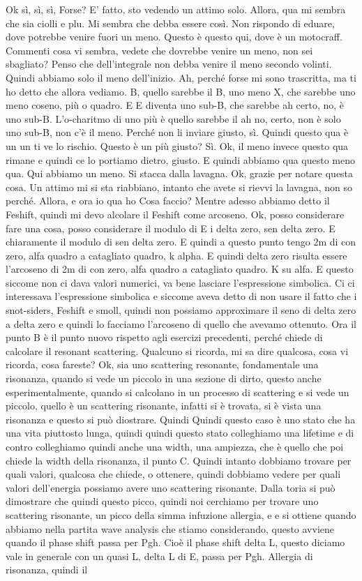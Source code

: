 {\begin{soluzione}
   Ok sì, sì, sì, Forse? E' fatto, sto vedendo un attimo solo. Allora, qua mi sembra che sia ciolli e plu. Mi sembra che debba essere così. Non rispondo di eduare, dove potrebbe venire fuori un meno. Questo è questo qui, dove è un motocraff. Commenti cosa vi sembra, vedete che dovrebbe venire un meno, non sei sbagliato? Penso che dell'integrale non debba venire il meno secondo volinti. Quindi abbiamo solo il meno dell'inizio. Ah, perché forse mi sono trascritta, ma ti ho detto che allora vediamo. B, quello sarebbe il B, uno meno X, che sarebbe uno meno coseno, più o quadro. E E diventa uno sub-B, che sarebbe ah certo, no, è uno sub-B. L'o-charitmo di uno più è quello sarebbe il ah no, certo, non è solo uno sub-B, non c'è il meno. Perché non li inviare giusto, sì. Quindi questo qua è un un ti ve lo rischio. Questo è un più giusto? Sì. Ok, il meno invece questo qua rimane e quindi ce lo portiamo dietro, giusto. E quindi abbiamo qua questo meno qua. Qui abbiamo un meno. Si stacca dalla lavagna. Ok, grazie per notare questa cosa. Un attimo mi si sta riabbiano, intanto che avete si rievvi la lavagna, non so perché. Allora, e ora io qua ho Cosa faccio? Mentre adesso abbiamo detto il Feshift, quindi mi devo alcolare il Feshift come arcoseno. Ok, posso considerare fare una cosa, posso considerare il modulo di E i delta zero, sen delta zero. E chiaramente il modulo di sen delta zero. E quindi a questo punto tengo 2m di con zero, alfa quadro a catagliato quadro, k alpha. E quindi delta zero risulta essere l'arcoseno di 2m di con zero, alfa quadro a catagliato quadro. K su alfa. E questo siccome non ci dava valori numerici, va bene lasciare l'espressione simbolica. Ci ci interessava l'espressione simbolica e siccome aveva detto di non usare il fatto che i snot-siders, Feshift e smoll, quindi non possiamo approximare il seno di delta zero a delta zero e quindi lo facciamo l'arcoseno di quello che avevamo ottenuto. Ora il punto B è il punto nuovo rispetto agli esercizi precedenti, perché chiede di calcolare il resonant scattering. Qualcuno si ricorda, mi sa dire qualcosa, cosa vi ricorda, cosa fareste? Ok, sia uno scattering resonante, fondamentale una risonanza, quando si vede un piccolo in una sezione di dirto, questo anche esperimentalmente, quando si calcolano in un processo di scattering e si vede un piccolo, quello è un scattering risonante, infatti si è trovata, si è vista una risonanza e questo si può diostrare. Quindi Quindi questo caso è uno stato che ha una vita piuttosto lunga, quindi quindi questo stato colleghiamo una lifetime e di contro colleghiamo quindi anche una width, una ampiezza, che è quello che poi chiede la width della risonanza, il punto C. Quindi intanto dobbiamo trovare per quali valori, qualcosa che chiede, o ottenere, quindi dobbiamo vedere per quali valori dell'energia possiamo avere uno scattering risonante. Dalla toria si può dimostrare che quindi questo picco, quindi noi cerchiamo per trovare uno scattering risonante, un picco della simma infuzione allergia, e e si ottiene quando abbiamo nella partita wave analysis che stiamo considerando, questo avviene quando il phase shift passa per Pgh. Cioè il phase shift delta L, questo diciamo vale in generale con un quasi L, delta L di E, passa per Pgh. Allergia di risonanza, quindi il 
\end{soluzione}}
